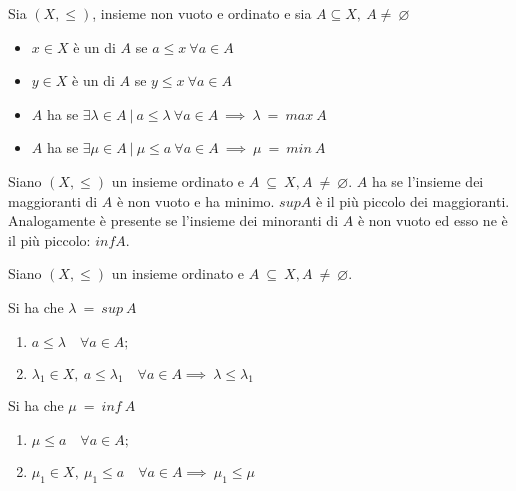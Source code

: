 \documentclass[../analisi.tex]{subfiles}
\begin{document}
\begin{defn} Sia $(X,\leq)$, insieme non vuoto e ordinato e sia $A \subseteq X,\ A \neq\ \varnothing$
\begin{itemize}
	\item $x \in X$ è un  di $A$ se $a \leq x\ \forall a\in A$
	\item $y \in X$ è un  di $A$ se $y \leq x\ \forall a\in A$
	\item $A$ ha  se $\exists \lambda \in A\ |\ a \leq \lambda\ \forall a \in A\ \implies\ \lambda\ =\ max\ A$
	\item $A$ ha  se $\exists \mu \in A\ |\ \mu \leq a\ \forall a \in A\ \implies\ \mu\ =\ min\ A$
\end{itemize}
\end{defn}

\begin{defn} Siano $(X,\leq)$ un insieme ordinato e $A\ \subseteq\ X, A\ \neq\ \varnothing$. $A$ ha  se l'insieme dei maggioranti di $A$ è non vuoto e ha minimo. $sup A$ è il più piccolo dei maggioranti.
Analogamente  è presente se l'insieme dei minoranti di $A$ è non vuoto ed esso ne è il più piccolo: $inf A$.
\end{defn}

\begin{defn} 

		Siano $(X,\leq)$ un insieme ordinato e $A\ \subseteq\ X, A\ \neq\ \varnothing $.

                 Si ha che $\lambda\ =\ sup\ A$ 
		\begin{enumerate}
			\item $a \leq \lambda \quad \forall a \in A;$
			\item $\lambda_1 \in X,\ a \leq \lambda_1 \quad \forall a \in A \implies\  \lambda \leq \lambda_1$
		\end{enumerate}

                
                 Si ha che $\mu\ =\ inf\ A$ 
		\begin{enumerate}
			\item $\mu \leq a \quad \forall a \in A;$
			\item $\mu_1 \in X,\ \mu_1 \leq a \quad \forall a \in A \implies\  \mu_1 \leq \mu $
		\end{enumerate}

\end{defn}
\end{document}

